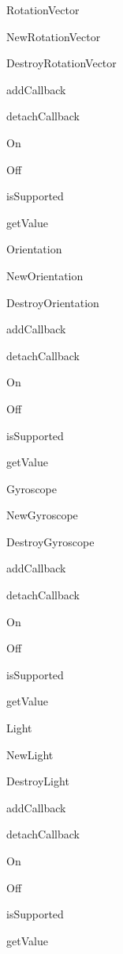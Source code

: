 \begin{DoxyItemize}
\begin{DoxyItemize}
\end{DoxyItemize}
\item Rotation\-Vector
\begin{DoxyItemize}
\item New\-Rotation\-Vector
\item Destroy\-Rotation\-Vector
\item add\-Callback
\item detach\-Callback
\item On
\item Off
\item is\-Supported
\item get\-Value
\end{DoxyItemize}
\item Orientation
\begin{DoxyItemize}
\item New\-Orientation
\item Destroy\-Orientation
\item add\-Callback
\item detach\-Callback
\item On
\item Off
\item is\-Supported
\item get\-Value
\end{DoxyItemize}
\item Gyroscope
\begin{DoxyItemize}
\item New\-Gyroscope
\item Destroy\-Gyroscope
\item add\-Callback
\item detach\-Callback
\item On
\item Off
\item is\-Supported
\item get\-Value
\end{DoxyItemize}
\item Light
\begin{DoxyItemize}
\item New\-Light
\item Destroy\-Light
\item add\-Callback
\item detach\-Callback
\item On
\item Off
\item is\-Supported
\item get\-Value
\end{DoxyItemize}

\end{DoxyItemize}
